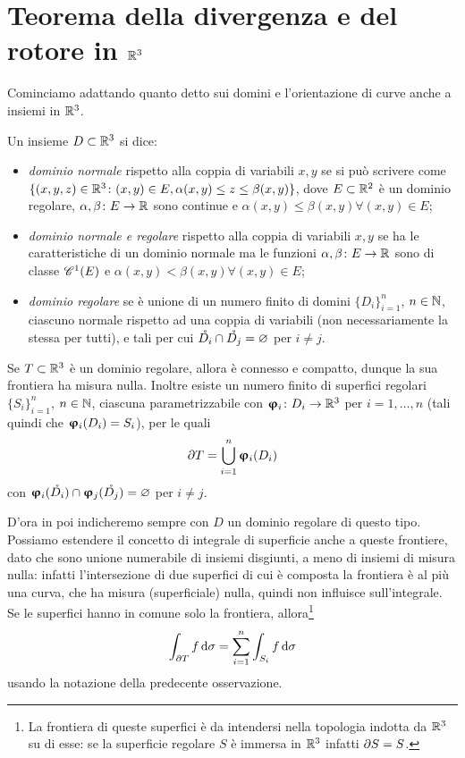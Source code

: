 \section{Teorema della divergenza e del rotore in $\R^3$}
Cominciamo adattando quanto detto sui domini e l'orientazione di curve anche a insiemi in $\R^3$.
\begin{definizione} \label{d:dominio-R3}
	Un insieme $D\subset\R^3$ si dice:
	\begin{itemize}
		\item \emph{dominio normale} rispetto alla coppia di variabili $x,y$ se si può scrivere come $\{(x,y,z)\in\R^3\colon(x,y)\in E, \alpha(x,y)\leq z\leq\beta(x,y)\}$, dove $E\subset\R^2$ è un dominio regolare, $\alpha,\beta\colon E\to\R$ sono continue e $\alpha(x,y)\leq\beta(x,y)\forall(x,y)\in E$;
		\item \emph{dominio normale e regolare} rispetto alla coppia di variabili $x,y$ se ha le caratteristiche di un dominio normale ma le funzioni $\alpha,\beta\colon E\to\R$ sono di classe $\cont[1]{E}$ e $\alpha(x,y)<\beta(x,y)\forall(x,y)\in E$;
		\item \emph{dominio regolare} se è unione di un numero finito di domini $\{D_i\}_{i=1}^n$, $n\in\N$, ciascuno normale rispetto ad una coppia di variabili (non necessariamente la stessa per tutti), e tali per cui $\interior{D_i}\cap\interior{D_j}=\emptyset$ per $i\neq j$.
	\end{itemize}
\end{definizione}
\begin{osservazione}
	Se $T\subset\R^3$ è un dominio regolare, allora è connesso e compatto, dunque la sua frontiera ha misura nulla.
	Inoltre esiste un numero finito di superfici regolari $\{S_i\}_{i=1}^n$, $n\in\N$, ciascuna parametrizzabile con $\vphi_i\colon D_i\to\R^3$ per $i=1,\dots,n$ (tali quindi che $\vphi_i(D_i)=S_i$), per le quali
	\begin{equation*}
		\boundary T=\bigcup_{i=1}^n\vphi_i(D_i)
	\end{equation*}
	con $\vphi_i(\interior{D_i})\cap\vphi_j(\interior{D_j})=\emptyset$ per $i\neq j$.
\end{osservazione}
D'ora in poi indicheremo sempre con $D$ un dominio regolare di questo tipo.
Possiamo estendere il concetto di integrale di superficie anche a queste frontiere, dato che sono unione numerabile di insiemi disgiunti, a meno di insiemi di misura nulla: infatti l'intersezione di due superfici di cui è composta la frontiera è al più una curva, che ha misura (superficiale) nulla, quindi non influisce sull'integrale.
Se le superfici hanno in comune solo la frontiera, allora\footnote{
	La frontiera di queste superfici è da intendersi nella topologia indotta da $\R^3$ su di esse: se la superficie regolare $S$ è immersa in $\R^3$ infatti $\boundary S=S$.
}
\begin{equation*}
	\int_{\boundary T}f\,\dd\sigma=\sum_{i=1}^n\int_{S_i}f\,\dd\sigma
\end{equation*}
usando la notazione della predecente osservazione.

